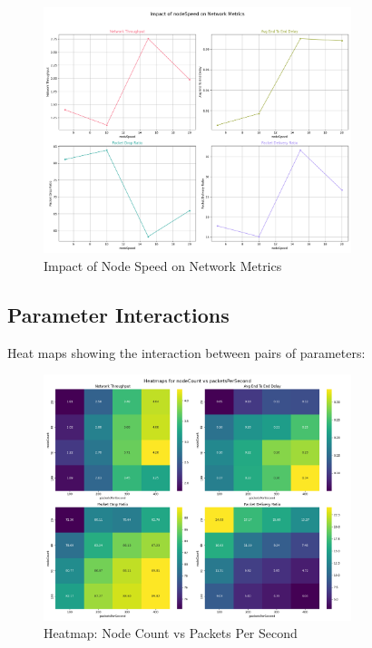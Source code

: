\documentclass{article}
\begin{document}
\begin{figure}[h]
\centering
\includegraphics[width=0.8\textwidth]{plots/task-1/single-input-params/analysis_nodeSpeed}
\caption{Impact of Node Speed on Network Metrics}
\end{figure}

\subsection{Parameter Interactions}
Heat maps showing the interaction between pairs of parameters:

\begin{figure}[h]
\centering
\includegraphics[width=0.8\textwidth]{plots/task-1/two-params-heatmaps/heatmap_nodeCount_packetsPerSecond}
\caption{Heatmap: Node Count vs Packets Per Second}
\end{figure}
\end{document}
